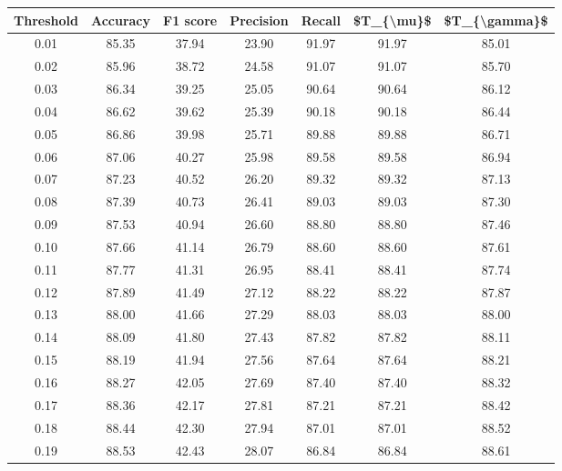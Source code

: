 \begin{tabular}{|c|c|c|c|c|c|c|}
\hline
 Threshold &  Accuracy &  F1 score &  Precision &  Recall &  \$T\_\{\textbackslash mu\}\$ &  \$T\_\{\textbackslash gamma\}\$ \\
\hline
      0.01 &     85.35 &     37.94 &      23.90 &   91.97 &      91.97 &         85.01 \\
      0.02 &     85.96 &     38.72 &      24.58 &   91.07 &      91.07 &         85.70 \\
      0.03 &     86.34 &     39.25 &      25.05 &   90.64 &      90.64 &         86.12 \\
      0.04 &     86.62 &     39.62 &      25.39 &   90.18 &      90.18 &         86.44 \\
      0.05 &     86.86 &     39.98 &      25.71 &   89.88 &      89.88 &         86.71 \\
      0.06 &     87.06 &     40.27 &      25.98 &   89.58 &      89.58 &         86.94 \\
      0.07 &     87.23 &     40.52 &      26.20 &   89.32 &      89.32 &         87.13 \\
      0.08 &     87.39 &     40.73 &      26.41 &   89.03 &      89.03 &         87.30 \\
      0.09 &     87.53 &     40.94 &      26.60 &   88.80 &      88.80 &         87.46 \\
      0.10 &     87.66 &     41.14 &      26.79 &   88.60 &      88.60 &         87.61 \\
      0.11 &     87.77 &     41.31 &      26.95 &   88.41 &      88.41 &         87.74 \\
      0.12 &     87.89 &     41.49 &      27.12 &   88.22 &      88.22 &         87.87 \\
      0.13 &     88.00 &     41.66 &      27.29 &   88.03 &      88.03 &         88.00 \\
      0.14 &     88.09 &     41.80 &      27.43 &   87.82 &      87.82 &         88.11 \\
      0.15 &     88.19 &     41.94 &      27.56 &   87.64 &      87.64 &         88.21 \\
      0.16 &     88.27 &     42.05 &      27.69 &   87.40 &      87.40 &         88.32 \\
      0.17 &     88.36 &     42.17 &      27.81 &   87.21 &      87.21 &         88.42 \\
      0.18 &     88.44 &     42.30 &      27.94 &   87.01 &      87.01 &         88.52 \\
      0.19 &     88.53 &     42.43 &      28.07 &   86.84 &      86.84 &         88.61 \\

\end{tabular}
